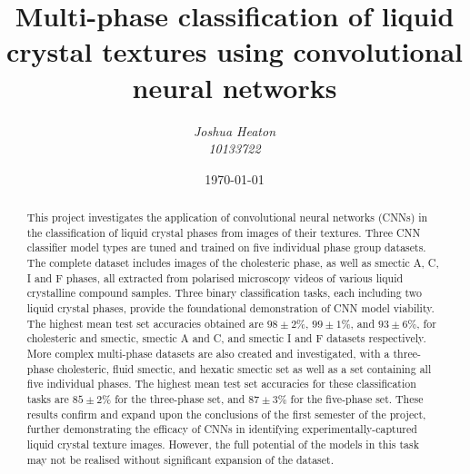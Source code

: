 \documentclass[12pt]{article}
\begin{document}
\title{Multi-phase classification of liquid crystal textures using convolutional neural networks}
\author{\textit{Joshua Heaton}\\\textit{10133722}}
\date{\today}

\maketitle

\begin{abstract}
This project investigates the application of convolutional neural networks (CNNs) in the classification of liquid crystal phases from images of their textures. Three CNN classifier model types are tuned and trained on five individual phase group datasets. The complete dataset includes images of the cholesteric phase, as well as smectic A, C, I and F phases, all extracted from polarised microscopy videos of various liquid crystalline compound samples. Three binary classification tasks, each including two liquid crystal phases, provide the foundational demonstration of CNN model viability. The highest mean test set accuracies obtained are $98\pm2\%$, $99\pm1\%$, and $93\pm6\%$, for cholesteric and smectic, smectic A and C, and smectic I and F datasets respectively. More complex multi-phase datasets are also created and investigated, with a three-phase cholesteric, fluid smectic, and hexatic smectic set as well as a set containing all five individual phases. The highest mean test set accuracies for these classification tasks are $85\pm2\%$ for the three-phase set, and $87\pm3\%$ for the five-phase set. These results confirm and expand upon the conclusions of the first semester of the project, further demonstrating the efficacy of CNNs in identifying experimentally-captured liquid crystal texture images. However, the full potential of the models in this task may not be realised without significant expansion of the dataset.
\end{abstract}

\newpage
\tableofcontents

\newpage
{}
\end{document}
